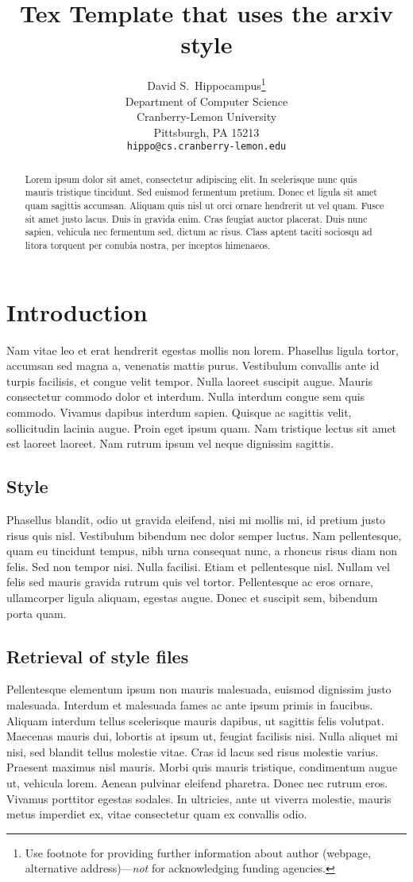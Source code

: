 \documentclass{article}
\title{Tex Template that uses the arxiv style}
\author{
  David S.~Hippocampus\thanks{Use footnote for providing further
    information about author (webpage, alternative
    address)---\emph{not} for acknowledging funding agencies.} \\
  Department of Computer Science\\
  Cranberry-Lemon University\\
  Pittsburgh, PA 15213 \\
  \texttt{hippo@cs.cranberry-lemon.edu} \\
}
\begin{document}
\maketitle

\begin{abstract}
Lorem ipsum dolor sit amet, consectetur adipiscing elit. In scelerisque nunc quis mauris tristique tincidunt. Sed euismod fermentum pretium. Donec et ligula sit amet quam sagittis accumsan. Aliquam quis nisl ut orci ornare hendrerit ut vel quam. Fusce sit amet justo lacus. Duis in gravida enim. Cras feugiat auctor placerat. Duis nunc sapien, vehicula nec fermentum sed, dictum ac risus. Class aptent taciti sociosqu ad litora torquent per conubia nostra, per inceptos himenaeos.
\end{abstract}

\section{Introduction}
Nam vitae leo et erat hendrerit egestas mollis non lorem. Phasellus ligula tortor, accumsan sed magna a, venenatis mattis purus. Vestibulum convallis ante id turpis facilisis, et congue velit tempor. Nulla laoreet suscipit augue. Mauris consectetur commodo dolor et interdum. Nulla interdum congue sem quis commodo. Vivamus dapibus interdum sapien. Quisque ac sagittis velit, sollicitudin lacinia augue. Proin eget ipsum quam. Nam tristique lectus sit amet est laoreet laoreet. Nam rutrum ipsum vel neque dignissim sagittis.

\subsection{Style}

Phasellus blandit, odio ut gravida eleifend, nisi mi mollis mi, id pretium justo risus quis nisl. Vestibulum bibendum nec dolor semper luctus. Nam pellentesque, quam eu tincidunt tempus, nibh urna consequat nunc, a rhoncus risus diam non felis. Sed non tempor nisi. Nulla facilisi. Etiam et pellentesque nisl. Nullam vel felis sed mauris gravida rutrum quis vel tortor. Pellentesque ac eros ornare, ullamcorper ligula aliquam, egestas augue. Donec et suscipit sem, bibendum porta quam.

\subsection{Retrieval of style files}
Pellentesque elementum ipsum non mauris malesuada, euismod dignissim justo malesuada. Interdum et malesuada fames ac ante ipsum primis in faucibus. Aliquam interdum tellus scelerisque mauris dapibus, ut sagittis felis volutpat. Maecenas mauris dui, lobortis at ipsum ut, feugiat facilisis nisi. Nulla aliquet mi nisi, sed blandit tellus molestie vitae. Cras id lacus sed risus molestie varius. Praesent maximus nisl mauris. Morbi quis mauris tristique, condimentum augue ut, vehicula lorem. Aenean pulvinar eleifend pharetra. Donec nec rutrum eros. Vivamus porttitor egestas sodales. In ultricies, ante ut viverra molestie, mauris metus imperdiet ex, vitae consectetur quam ex convallis odio.
\end{document}
